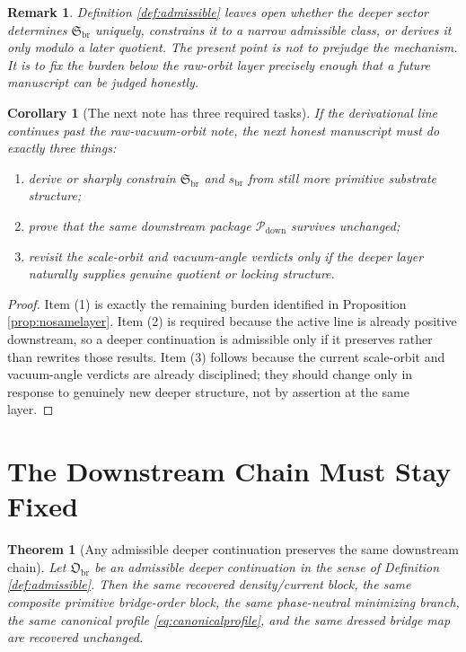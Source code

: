 \documentclass[11pt]{article}
\newcommand{\DownPkg}{\mathscr P_{\mathrm{down}}}
\newcommand{\ShapeTuple}{\mathfrak S_{\mathrm{br}}}
\newcommand{\DeepSector}{\mathfrak O_{\mathrm{br}}}
\newcommand{\ScaleMod}{s_{\mathrm{br}}}
\newtheorem{remark}{Remark}
\newtheorem{corollary}{Corollary}
\newtheorem{theorem}{Theorem}
\begin{document}
\begin{remark}
Definition \ref{def:admissible} leaves open whether the deeper sector determines \(\ShapeTuple\) uniquely, constrains it to a narrow admissible class, or derives it only modulo a later quotient. The present point is not to prejudge the mechanism. It is to fix the burden below the raw-orbit layer precisely enough that a future manuscript can be judged honestly.
\end{remark}

\begin{corollary}[The next note has three required tasks]
\label{cor:threetasks}
If the derivational line continues past the raw-vacuum-orbit note, the next honest manuscript must do exactly three things:
\begin{enumerate}
    \item derive or sharply constrain \(\ShapeTuple\) and \(\ScaleMod\) from still more primitive substrate structure;
    \item prove that the same downstream package \(\DownPkg\) survives unchanged;
    \item revisit the scale-orbit and vacuum-angle verdicts only if the deeper layer naturally supplies genuine quotient or locking structure.
\end{enumerate}
\end{corollary}

\begin{proof}
Item (1) is exactly the remaining burden identified in Proposition \ref{prop:nosamelayer}. Item (2) is required because the active line is already positive downstream, so a deeper continuation is admissible only if it preserves rather than rewrites those results. Item (3) follows because the current scale-orbit and vacuum-angle verdicts are already disciplined; they should change only in response to genuinely new deeper structure, not by assertion at the same layer.
\end{proof}

\section{The Downstream Chain Must Stay Fixed}

\begin{theorem}[Any admissible deeper continuation preserves the same downstream chain]
\label{thm:fixed}
Let \(\DeepSector\) be an admissible deeper continuation in the sense of Definition \ref{def:admissible}. Then the same recovered density/current block, the same composite primitive bridge-order block, the same phase-neutral minimizing branch, the same canonical profile \eqref{eq:canonicalprofile}, and the same dressed bridge map are recovered unchanged.
\end{theorem}
\end{document}
